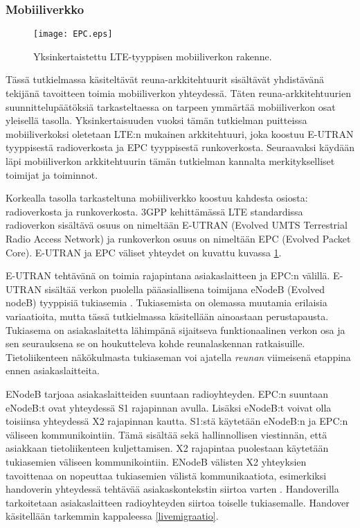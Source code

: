 \subsubsection{Mobiiliverkko}
\begin{figure}[tb]
\texttt{[image: EPC.eps]}
\caption{Yksinkertaistettu LTE-tyyppisen mobiiliverkon rakenne.} \label{fig:mobiarch}
\end{figure}

Tässä tutkielmassa käsiteltävät reuna-arkkitehtuurit sisältävät yhdistävänä tekijänä tavoitteen toimia mobiiliverkon yhteydessä. 
Täten reuna-arkkitehtuurien suunnittelupäätöksiä tarkasteltaessa on tarpeen ymmärtää mobiiliverkon osat yleisellä tasolla.
Yksinkertaisuuden vuoksi tämän tutkielman puitteissa mobiiliverkoksi oletetaan LTE:n mukainen arkkitehtuuri, joka koostuu E-UTRAN tyyppisestä radioverkosta ja EPC tyyppisestä runkoverkosta.
Seuraavaksi käydään läpi mobiiliverkon arkkitehtuurin tämän tutkielman kannalta merkitykselliset toimijat ja toiminnot.

Korkealla tasolla tarkasteltuna mobiiliverkko koostuu kahdesta osiosta: radioverkosta ja runkoverkosta. 3GPP kehittämässä LTE standardissa radioverkon sisältävä osuus on nimeltään E-UTRAN (Evolved UMTS Terrestrial Radio Access Network) ja runkoverkon osuus on nimeltään EPC (Evolved Packet Core).
E-UTRAN ja EPC väliset yhteydet on kuvattu kuvassa \ref{fig:mobiarch}.

E-UTRAN tehtävänä on toimia rajapintana asiakaslaitteen ja EPC:n välillä. 
E-UTRAN sisältää verkon puolella pääasiallisena toimijana eNodeB (Evolved nodeB) tyyppisiä tukiasemia \cite{etsieutran}.
Tukiasemista on olemassa muutamia erilaisia variaatioita, mutta tässä tutkielmassa käsitellään ainoastaan perustapausta.
Tukiasema on asiakaslaitetta lähimpänä sijaitseva funktionaalinen verkon osa ja sen seurauksena se on houkutteleva kohde reunalaskennan ratkaisuille. Tietoliikenteen näkökulmasta tukiaseman voi ajatella \textit{reunan} viimeisenä etappina ennen asiakaslaitteita. 

ENodeB tarjoaa asiakaslaitteiden suuntaan radioyhteyden.
EPC:n suuntaan eNodeB:t ovat yhteydessä S1 rajapinnan avulla.
Lisäksi eNodeB:t voivat olla toisiinsa yhteydessä X2 rajapinnan kautta.
S1:stä käytetään eNodeB:n ja EPC:n väliseen kommunikointiin. Tämä sisältää sekä hallinnollisen viestinnän, että asiakkaan tietoliikenteen kuljettamisen.
X2 rajapintaa puolestaan käytetään tukiasemien väliseen kommunikointiin. 
ENodeB välisten X2 yhteyksien tavoittenaa on nopeuttaa tukiasemien välistä kommunikaatiota, esimerkiksi handoverin yhteydessä tehtävää asiakaskontekstin siirtoa varten \cite{3gpplte}.
Handoverilla tarkoitetaan asiakaslaitteen radioyhteyden siirtoa toiselle tukiasemalle. Handover käsitellään tarkemmin kappaleessa \ref{livemigraatio}.

